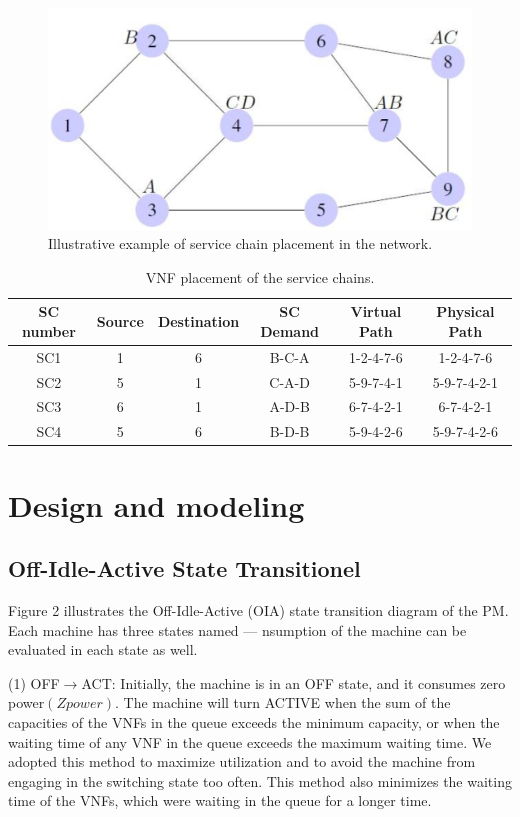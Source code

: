 \documentclass[12pt]{article}
\begin{document}
\begin{figure}[t!] \label{fig:1}
  \includegraphics[width=\linewidth]{fig1.png}
  \caption{ Illustrative example of service chain placement in the network.}
\end{figure}

\begin{table}[t!]
\caption{VNF placement of the service chains.}

\centering
\begin{tabular}{|c|c|c|c|c|c|} 
 \hline
 SC number& Source&Destination&SC Demand&Virtual Path&Physical Path \\ [0.5ex] 
 \hline 
SC1&1&6&B-C-A&1-2-4-7-6&1-2-4-7-6 \\ [0.5ex]  
 \hline
SC2&5&1&C-A-D&5-9-7-4-1&5-9-7-4-2-1 \\ [0.5ex]
 \hline
SC3&6&1&A-D-B&6-7-4-2-1&6-7-4-2-1 \\ [0.5ex]
 \hline
SC4&5&6&B-D-B&5-9-4-2-6&5-9-7-4-2-6 \\ [1ex]
 \hline
\end{tabular}
\label{table:1}
\end{table}

\section{Design and modeling}
\subsection{Off-Idle-Active State Transitionel}
Figure 2 illustrates the Off-Idle-Active (OIA) state transition
diagram of the PM. Each machine has three states named ---
nsumption of the machine can be evaluated in each state as
well.

(1) OFF$\rightarrow$ACT: Initially, the machine is in an OFF state,
and it consumes zero power$(Zpower)$. The machine will turn
ACTIVE when the sum of the capacities of the VNFs in the
queue exceeds the minimum capacity, or when the waiting
time of any VNF in the queue exceeds the maximum waiting
time. We adopted this method to maximize utilization and to
avoid the machine from engaging in the switching state too
often. This method 
also minimizes the waiting time of the
VNFs, which were waiting in the queue for a longer time.
\end{document}
